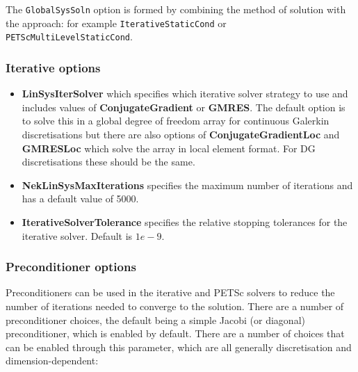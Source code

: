 The \texttt{GlobalSysSoln} option is formed by combining the method of solution
with the approach: for example \texttt{IterativeStaticCond} or
\texttt{PETScMultiLevelStaticCond}.

\subsubsection{Iterative  options}
\begin{itemize}
\item \textbf{LinSysIterSolver} which specifies which iterative solver
  strategy to use and includes values of \textbf{ConjugateGradient} or
  \textbf{GMRES}. The default option is to solve this in a global
  degree of freedom array for continuous Galerkin discretisations but
  there are also options of \textbf{ConjugateGradientLoc} and
  \textbf{GMRESLoc} which solve the array in local element format. For
  DG discretisations these should be the same.
\item \textbf{NekLinSysMaxIterations} specifies the maximum number of
  iterations and has a default value of 5000.
\item \textbf{IterativeSolverTolerance} specifies the relative
    stopping tolerances for the iterative solver. Default is $1e-9$.
\end{itemize} 

\subsubsection{Preconditioner options}

Preconditioners can be used in the iterative and PETSc solvers to reduce the
number of iterations needed to converge to the solution. There are a number of
preconditioner choices, the default being a simple Jacobi (or diagonal)
preconditioner, which is enabled by default. There are a number of choices that
can be enabled through this parameter, which are all generally discretisation
and dimension-dependent:

